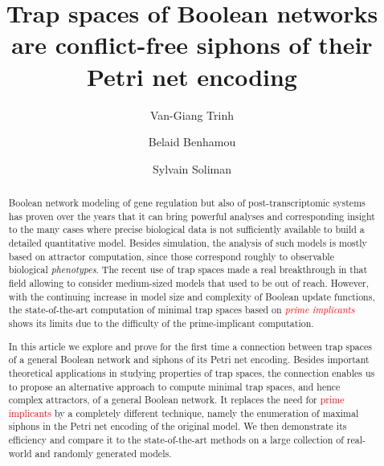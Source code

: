 \documentclass[preprint,12pt]{elsarticle}
\newcommand{\change}[1]{\textcolor{red}{#1}}
\begin{document}
\begin{frontmatter}

\title{Trap spaces of Boolean networks are conflict-free siphons of their Petri net encoding}

\author{Van-Giang Trinh}

\author{Belaid Benhamou}


\author{Sylvain Soliman}



\begin{abstract}

Boolean network modeling of gene regulation but also of post-trans\-criptomic systems has proven over the years that it can bring powerful analyses and corresponding insight to the many cases where precise biological data is not sufficiently available to build a detailed quantitative model.
Besides simulation, the analysis of such models is mostly based on attractor computation, since those correspond roughly to observable biological \emph{phenotypes}.
The recent use of trap spaces made a real breakthrough in that field allowing to consider medium-sized models that used to be out of reach.
However, with the continuing increase in model size and complexity of Boolean update functions, the state-of-the-art computation of minimal trap spaces based on \emph{\change{prime implicants}} shows its limits due to the difficulty of the prime-implicant computation.

In this article we explore and prove for the first time a connection between trap spaces of a general Boolean network and siphons of its Petri net encoding.
Besides important theoretical applications in studying properties of trap spaces, the connection enables us to propose an alternative approach to compute minimal trap spaces, and hence complex attractors, of a general Boolean network.
It replaces the need for \change{prime implicants} by a completely different technique, namely the enumeration of maximal siphons in the Petri net encoding of the original model.
We then demonstrate its efficiency and compare it to the state-of-the-art methods on a large collection of real-world and randomly generated models.


\end{abstract}
\end{frontmatter}
\end{document}
